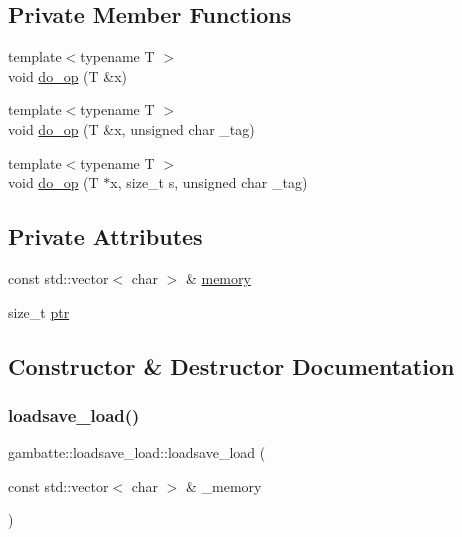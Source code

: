 \subsection*{Private Member Functions}
\begin{DoxyCompactItemize}
\item 
{\footnotesize template$<$typename T $>$ }\\void \hyperlink{classgambatte_1_1loadsave__load_a45e10c2b20eea19e3b92fe0560c5e107}{do\+\_\+op} (T \&x)
\item 
{\footnotesize template$<$typename T $>$ }\\void \hyperlink{classgambatte_1_1loadsave__load_adff7d2df0225532d464ea7d9f9d1458a}{do\+\_\+op} (T \&x, unsigned char \+\_\+tag)
\item 
{\footnotesize template$<$typename T $>$ }\\void \hyperlink{classgambatte_1_1loadsave__load_a9f958d9dff1f36f82b393c8cf4c734cb}{do\+\_\+op} (T $\ast$x, size\+\_\+t s, unsigned char \+\_\+tag)
\end{DoxyCompactItemize}
\subsection*{Private Attributes}
\begin{DoxyCompactItemize}
\item 
const std\+::vector$<$ char $>$ \& \hyperlink{classgambatte_1_1loadsave__load_aaf91faa9fd5d0ce6d4ff3d4e7749ce1d}{memory}
\item 
size\+\_\+t \hyperlink{classgambatte_1_1loadsave__load_ab49af43a813936002e9adb21103beae8}{ptr}
\end{DoxyCompactItemize}


\subsection{Constructor \& Destructor Documentation}
\mbox{\label{classgambatte_1_1loadsave__load_a8a06e288abaaf2196cf2bfe9ad5c1615}} 
\subsubsection{\texorpdfstring{loadsave\+\_\+load()}{loadsave\_load()}}
{\footnotesize\ttfamily gambatte\+::loadsave\+\_\+load\+::loadsave\+\_\+load (\begin{DoxyParamCaption}\item[{const std\+::vector$<$ char $>$ \&}]{\+\_\+memory }\end{DoxyParamCaption})}

